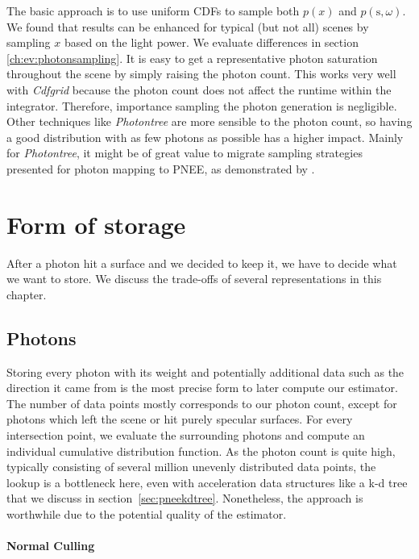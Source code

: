 The basic approach is to use uniform CDFs to sample both $p(x)$ and $p(\text{s}, \omega)$. We found that results can be enhanced for typical (but not all) scenes by sampling $x$ based on the light power. We evaluate differences in section \ref{ch:ev:photonsampling}. It is easy to get a representative photon saturation throughout the scene by simply raising the photon count. This works very well with \textit{Cdfgrid} because the photon count does not affect the runtime within the integrator. Therefore, importance sampling the photon generation is negligible. Other techniques like \textit{Photontree} are more sensible to the photon count, so having a good distribution with as few photons as possible has a higher impact. Mainly for \textit{Photontree}, it might be of great value to migrate sampling strategies presented for photon mapping to PNEE, as demonstrated by \textcite{DBLP:conf/rt/PeterP98, DBLP:conf/rt/SuykensW00, DBLP:journals/vc/ZhengZ15}.

\section{Form of storage}
\label{ch:formofstorage}

After a photon hit a surface and we decided to keep it, we have to decide what we want to store. We discuss the trade-offs of several representations in this chapter. 

\subsection{Photons}

Storing every photon with its weight and potentially additional data such as the direction it came from is the most precise form to later compute our estimator. The number of data points mostly corresponds to our photon count, except for photons which left the scene or hit purely specular surfaces. For every intersection point, we evaluate the surrounding photons and compute an individual cumulative distribution function. As the photon count is quite high, typically consisting of several million unevenly distributed data points, the lookup is a bottleneck here, even with acceleration data structures like a k-d tree that we discuss in section~\ref{sec:pneekdtree}. Nonetheless, the approach is worthwhile due to the potential quality of the estimator.

\paragraph*{Normal Culling}
\label{ch:normalculling}

